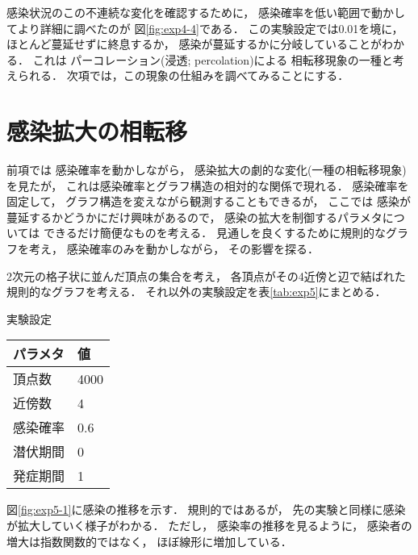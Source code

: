 \documentclass[10pt,oneside]{scrartcl}
\begin{document}
\begin{figure*}%
  \centering
\end{figure*}

感染状況のこの不連続な変化を確認するために，
感染確率を低い範囲で動かしてより詳細に調べたのが
図\ref{fig:exp4-4}である．
この実験設定では0.01を境に，
ほとんど蔓延せずに終息するか，
感染が蔓延するかに分岐していることがわかる．
これは
パーコレーション(浸透; percolation)による
相転移現象の一種と考えられる．
次項では，この現象の仕組みを調べてみることにする．

\section{感染拡大の相転移}
\label{sec:org7cc0987}

前項では
感染確率を動かしながら，
感染拡大の劇的な変化(一種の相転移現象)を見たが，
これは感染確率とグラフ構造の相対的な関係で現れる．
感染確率を固定して，
グラフ構造を変えながら観測することもできるが，
ここでは
感染が蔓延するかどうかにだけ興味があるので，
感染の拡大を制御するパラメタについては
できるだけ簡便なものを考える．
見通しを良くするために規則的なグラフを考え，
感染確率のみを動かしながら，
その影響を探る．

2次元の格子状に並んだ頂点の集合を考え，
各頂点がその4近傍と辺で結ばれた規則的なグラフを考える．
それ以外の実験設定を表\ref{tab:exp5}にまとめる．

\begin{margintable}
  \caption{実験設定}
  \label{tab:exp5}
  \small
  \begin{tabular}{ll}
    \toprule
    パラメタ&値 \\
    \midrule
    頂点数&4000 \\
    近傍数&4 \\
    感染確率&0.6 \\
    潜伏期間&0 \\
    発症期間&1 \\
    \bottomrule
  \end{tabular}
\end{margintable}

図\ref{fig:exp5-1}に感染の推移を示す．
規則的ではあるが，
先の実験と同様に感染が拡大していく様子がわかる．
ただし，
感染率の推移を見るように，
感染者の増大は指数関数的ではなく，
ほぼ線形に増加している．
\end{document}
